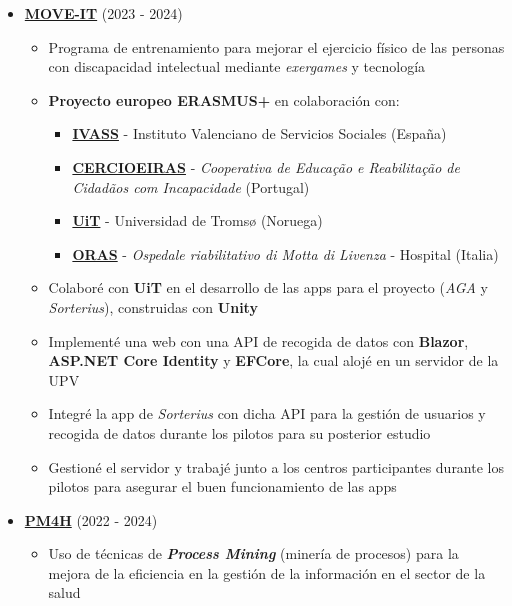 \documentclass[letterpaper, 12pt, dvipsnames]{article}
\newcommand{\upv}{UPV}
\begin{document}
\begin{itemize}
    \item {\large\textbf{\href{https://moveit.webs.upv.es/es/}{MOVE-IT}}} (2023 - 2024)
          \begin{itemize}
              \item Programa de entrenamiento para mejorar el ejercicio físico de las personas con discapacidad intelectual mediante \textit{exergames} y tecnología
              \item \textbf{Proyecto europeo ERASMUS+} en colaboración con:
                    \begin{itemize}
                        \item \textbf{\href{https://www.ivass.gva.es/}{IVASS}} - Instituto Valenciano de Servicios Sociales (España)
                        \item \textbf{\href{https://www.cercioeiras.pt/pt}{CERCIOEIRAS}} - \textit{Cooperativa de Educação e Reabilitação de Cidadãos com Incapacidade} (Portugal)
                        \item \textbf{\href{https://en.uit.no/}{UiT}} - Universidad de Tromsø (Noruega)
                        \item \textbf{\href{https://www.ospedalemotta.it/it/}{ORAS}} - \textit{Ospedale riabilitativo di Motta di Livenza} - Hospital (Italia)
                    \end{itemize}
              \item Colaboré con \textbf{UiT} en el desarrollo de las apps para el proyecto (\textit{AGA} y \textit{Sorterius}), construidas con \textbf{Unity}
              \item Implementé una web con una API de recogida de datos con \textbf{Blazor}, \textbf{ASP.NET Core Identity} y \textbf{EFCore}, la cual alojé en un servidor de la \upv
              \item Integré la app de \textit{Sorterius} con dicha API para la gestión de usuarios y recogida de datos durante los pilotos para su posterior estudio
              \item Gestioné el servidor y trabajé junto a los centros participantes durante los pilotos para asegurar el buen funcionamiento de las apps
          \end{itemize}
    \item {\large\textbf{\href{https://pm4health.com/}{PM4H}}} (2022 - 2024)
          \begin{itemize}
              \item Uso de técnicas de \textbf{\emph{Process Mining}} (minería de procesos) para la mejora de la eficiencia en la gestión de la información en el sector de la salud

\end{itemize}
\end{itemize}
\end{document}
